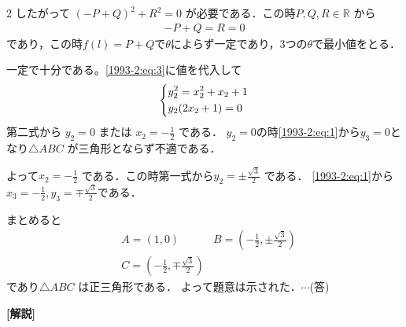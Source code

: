 \documentclass[../../../../main.tex]{subfiles}
\begin{document}
\begin{multicols}{2}
  したがって $(-P+Q)^2+R^2=0$ が必要である．この時$P,Q,R \in \mathbb{R}$ から
  \begin{align*}
    -P+Q=R=0
  \end{align*}
  であり，この時$f(l)=P+Q$で$\theta$によらず一定であり，$3$つの$\theta$で最小値をとる．

  一定で十分である。\cref{1993-2:eq:3}に値を代入して
  \begin{align*}
    \begin{dcases}
      y_2^2 = x_2^2+x_2+1 \\
      y_2(2x_2+1) = 0
    \end{dcases}
  \end{align*}
  第二式から $y_2=0$ または $x_2=-\frac{1}{2}$ である．
  $y_2=0$の時\cref{1993-2:eq:1}から$y_3=0$となり$\triangle ABC$ が三角形とならず不適である．

  よって$x_2=-\frac{1}{2}$ である．この時第一式から$y_2=\pm\frac{\sqrt{3}}{2}$ である．
  \cref{1993-2:eq:1}から$x_3 =-\frac{1}{2}, y_3=\mp\frac{\sqrt{3}}{2}$である．

  まとめると
  \begin{align*}
     & A=(1,0)
     & B=(-\frac{1}{2}, \pm\frac{\sqrt{3}}{2}) \\
     & C=(-\frac{1}{2}, \mp\frac{\sqrt{3}}{2})
  \end{align*}
  であり$\triangle ABC$ は正三角形である．
  よって題意は示された．$\cdots$(答)
  \vspace{10pt}

  {\bf[解説]}

  \newpage
\end{multicols}
\end{document}
